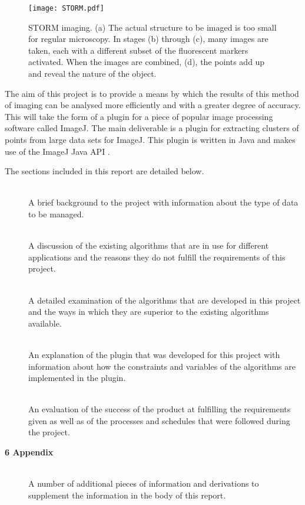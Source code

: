 \begin{figure}[tbh]
	\centering
	\texttt{[image: STORM.pdf]}

	\caption[Creation of a STORM image.]{STORM imaging. (a) The actual
		structure to be imaged is too small for regular microscopy. In stages
		(b) through (c), many images are taken, each with a different subset of
		the fluorescent markers activated. When the images are combined, (d),
		the points add up and reveal the nature of the object.}\label{fig:STORM}
\end{figure}

The aim of this project is to provide a means by which the results of this
method of imaging can be analysed more efficiently and with a greater degree of
accuracy. This will take the form of a plugin for a piece of popular image
processing software called ImageJ. The main deliverable is a plugin for
extracting clusters of points from large data sets for ImageJ. This plugin is
written in Java and makes use of the ImageJ Java API \cite{imagejapi}.

The sections included in this report are detailed below.

\begin{description}
	\item[] \hfill \\
		A brief background to the project with information about the type of
		data to be managed.

	\item[] \hfill \\
		A discussion of the existing algorithms that are in use for different
		applications and the reasons they do not fulfill the requirements of
		this project.

	\item[] \hfill \\
		A detailed examination of the algorithms that are developed in this
		project and the ways in which they are superior to the existing
		algorithms available.

	\item[] \hfill \\
		An explanation of the plugin that was developed for this project with
		information about how the constraints and variables of the algorithms
		are implemented in the plugin.

	\item[] \hfill \\
		An evaluation of the success of the product at fulfilling the
		requirements given as well as of the processes and schedules that were
		followed during the project.

	\item[\textbf{6 Appendix}] \hfill \\
		A number of additional pieces of information and derivations to
		supplement the information in the body of this report.
\end{description}
